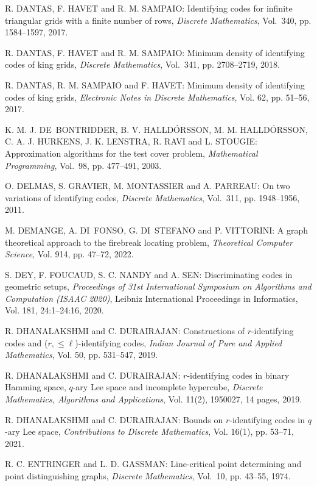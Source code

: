 \begin{thebibliography}{999}
R. DANTAS, F. HAVET and R. M. SAMPAIO: Identifying codes for infinite triangular grids with a finite number of rows, {\it Discrete Mathematics}, Vol.~340, pp. 1584--1597, 2017.

R. DANTAS, F. HAVET and R. M. SAMPAIO: Minimum density of identifying codes of king grids, {\it Discrete Mathematics}, Vol.~341, pp. 2708--2719, 2018.

R. DANTAS, R. M. SAMPAIO and F. HAVET: Minimum density of identifying codes of king grids, {\it Electronic Notes in Discrete Mathematics}, Vol. 62, pp. 51--56, 2017.

K. M. J. DE~BONTRIDDER, B. V. HALLD\'ORSSON, M. M. HALL\-D\'ORS\-SON, C. A. J. HURKENS, J. K. LENSTRA, R. RAVI and L. STOU\-GIE: Approximation algorithms for the test cover problem, {\it Mathematical Programming}, Vol.~98, pp. 477--491, 2003.

O. DELMAS, S. GRAVIER, M. MONTASSIER and A. PARREAU: On two variations of identifying codes, {\it Discrete Mathematics}, Vol.~311, pp. 1948--1956, 2011.

M. DEMANGE, A. DI~FONSO, G. DI~STEFANO and P. VITTORINI: A graph theoretical approach to the firebreak locating problem, {\it Theoretical Computer Science}, Vol. 914, pp. 47--72, 2022.

S. DEY, F. FOUCAUD, S. C. NANDY and A. SEN: Discriminating codes in geometric setups, {\it Proceedings of 31st International Symposium on Algorithms and Computation (ISAAC 2020)}, Leibniz International Proceedings in Informatics, Vol. 181, 24:1--24:16, 2020.

R. DHANALAKSHMI and C. DURAIRAJAN: Constructions of $r$-identifying codes and ($r,\leq \ell$)-identifying codes, {\it Indian Journal of Pure and Applied Mathematics}, Vol. 50, pp. 531--547, 2019.

R. DHANALAKSHMI and C. DURAIRAJAN: $r$-identifying codes in binary Hamming space, $q$-ary Lee space and incomplete hypercube, {\it Discrete Mathematics, Algorithms and Applications}, Vol. 11(2), 1950027, 14 pages, 2019.

R. DHANALAKSHMI and C. DURAIRAJAN: Bounds on $r$-identifying codes in $q$-ary Lee space, {\it Contributions to Discrete Mathematics}, Vol. 16(1), pp. 53--71, 2021.

R. C. ENTRINGER and L. D. GASSMAN: Line-critical point determining and point distinguishing graphs, {\it Discrete Mathematics}, Vol.~10, pp. 43--55, 1974.


\end{thebibliography}
